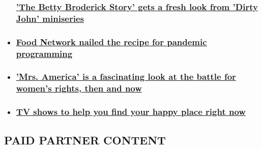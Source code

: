 \begin{itemize}
{  \subsubsection{\texorpdfstring{\href{/2020/06/02/entertainment/betty-broderick-story/index.html}{'The
  Betty Broderick Story' gets a fresh look from 'Dirty John'
  miniseries}}{'The Betty Broderick Story' gets a fresh look from 'Dirty John' miniseries}}\label{the-betty-broderick-story-gets-a-fresh-look-from-dirty-john-miniseries}}
\item
  \hypertarget{food-network-nailed-the-recipe-for-pandemic-programming}{%
  \subsubsection{\texorpdfstring{\href{/2020/05/20/entertainment/food-network-programming/index.html}{Food
  Network nailed the recipe for pandemic
  programming}}{Food Network nailed the recipe for pandemic programming}}\label{food-network-nailed-the-recipe-for-pandemic-programming}}
\item
  \hypertarget{mrs-america-is-a-fascinating-look-at-the-battle-for-womens-rights-then-and-now}{%
  \subsubsection{\texorpdfstring{\href{/2020/04/14/entertainment/mrs-america-review/index.html}{'Mrs.
  America' is a fascinating look at the battle for women's rights, then
  and
  now}}{'Mrs. America' is a fascinating look at the battle for women's rights, then and now}}\label{mrs-america-is-a-fascinating-look-at-the-battle-for-womens-rights-then-and-now}}
\item
  \hypertarget{tv-shows-to-help-you-find-your-happy-place-right-now}{%
  \subsubsection{\texorpdfstring{\href{/2020/03/11/entertainment/happy-tv-shows/index.html}{TV
  shows to help you find your happy place right
  now}}{TV shows to help you find your happy place right now}}\label{tv-shows-to-help-you-find-your-happy-place-right-now}}
\end{itemize}

\hypertarget{paid-partner-content-}{%
\subsection{PAID PARTNER CONTENT~}\label{paid-partner-content-}}

